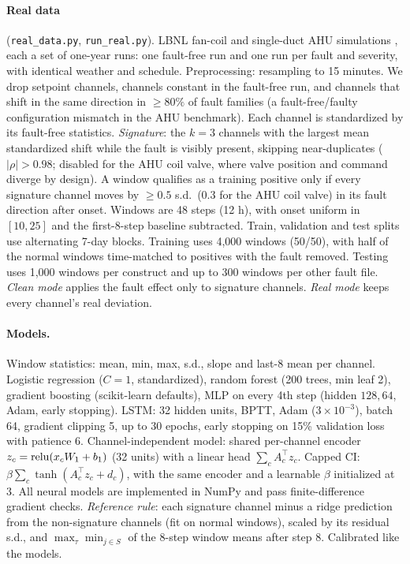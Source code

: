 \paragraph{Real data} (\texttt{real\_data.py}, \texttt{run\_real.py}). LBNL fan-coil and single-duct AHU simulations \citep{granderson2023}, each a set of one-year runs: one fault-free run and one run per fault and severity, with identical weather and schedule. Preprocessing: resampling to 15 minutes. We drop setpoint channels, channels constant in the fault-free run, and channels that shift in the same direction in $\ge80\%$ of fault families (a fault-free/faulty configuration mismatch in the AHU benchmark). Each channel is standardized by its fault-free statistics. \emph{Signature}: the $k=3$ channels with the largest mean standardized shift while the fault is visibly present, skipping near-duplicates ($|\rho|>0.98$; disabled for the AHU coil valve, where valve position and command diverge by design). A window qualifies as a training positive only if every signature channel moves by $\ge0.5$ s.d.\ ($0.3$ for the AHU coil valve) in its fault direction after onset. Windows are 48 steps (12 h), with onset uniform in $[10,25]$ and the first-8-step baseline subtracted. Train, validation and test splits use alternating 7-day blocks. Training uses 4,000 windows (50/50), with half of the normal windows time-matched to positives with the fault removed. Testing uses 1,000 windows per construct and up to 300 windows per other fault file. \emph{Clean mode} applies the fault effect only to signature channels. \emph{Real mode} keeps every channel's real deviation.

\paragraph{Models.} Window statistics: mean, min, max, s.d., slope and last-8 mean per channel. Logistic regression ($C=1$, standardized), random forest (200 trees, min leaf 2), gradient boosting (scikit-learn defaults), MLP on every 4th step (hidden $128,64$, Adam, early stopping). LSTM: 32 hidden units, BPTT, Adam ($3\times10^{-3}$), batch 64, gradient clipping 5, up to 30 epochs, early stopping on 15\% validation loss with patience 6. Channel-independent model: shared per-channel encoder $z_c=\mathrm{relu}(x_cW_1+b_1)$ (32 units) with a linear head $\sum_cA_c^\top z_c$. Capped CI: $\beta\sum_c\tanh(A_c^\top z_c+d_c)$, with the same encoder and a learnable $\beta$ initialized at 3. All neural models are implemented in NumPy and pass finite-difference gradient checks. \emph{Reference rule}: each signature channel minus a ridge prediction from the non-signature channels (fit on normal windows), scaled by its residual s.d., and $\max_\tau\min_{j\in S}$ of the 8-step window means after step 8. Calibrated like the models.

